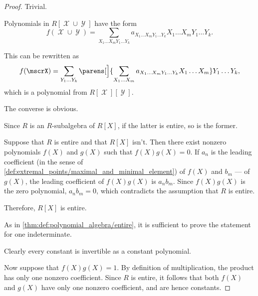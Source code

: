 \begin{proof}
   Trivial.

   Polynomials in \( R[\mscrX \cup \mscrY] \) have the form
  \begin{equation*}
    f(\mscrX \cup \mscrY) = \sum_{X_1 \ldots X_m Y_1 \ldots Y_k} a_{X_1 \ldots X_m Y_1 \ldots Y_k} X_1 \ldots X_m Y_1 \ldots Y_k.
  \end{equation*}

  This can be rewritten as
  \begin{equation*}
    f(\mscrX) = \sum_{Y_1 \ldots Y_k} \parens[\Big]{ \sum_{X_1 \ldots X_m} a_{X_1 \ldots X_m Y_1 \ldots Y_k} X_1 \ldots X_m } Y_1 \ldots Y_k,
  \end{equation*}
  which is a polynomial from \( R[\mscrX][\mscrY] \).

  The converse is obvious.


  \SufficiencySubProof Since \( R \) is an \( R \)-subalgebra of \( R[X] \), if the latter is entire, so is the former.

  \NecessitySubProof Suppose that \( R \) is entire and that \( R[X] \) isn't. Then there exist nonzero polynomials \( f(X) \) and \( g(X) \) such that \( f(X) g(X) = 0 \). If \( a_n \) is the leading coefficient (in the sense of \cref{def:extremal_points/maximal_and_minimal_element}) of \( f(X) \) and \( b_m \) --- of \( g(X) \), the leading coefficient of \( f(X) g(X) \) is \( a_n b_m \). Since \( f(X) g(X) \) is the zero polynomial, \( a_n b_m = 0 \), which contradicts the assumption that \( R \) is entire.

  Therefore, \( R[X] \) is entire.

   As in \cref{thm:def:polynomial_algebra/entire}, it is sufficient to prove the statement for one indeterminate.

  Clearly every constant is invertible as a constant polynomial.

  Now suppose that \( f(X) g(X) = 1 \). By definition of multiplication, the product has only one nonzero coefficient. Since \( R \) is entire, it follows that both \( f(X) \) and \( g(X) \) have only one nonzero coefficient, and are hence constants.
\end{proof}

